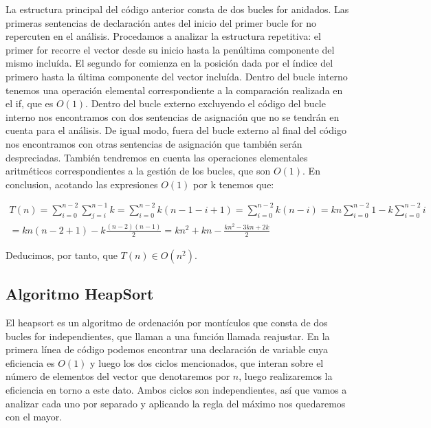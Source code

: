 \documentclass{homework}
\begin{document}
    La estructura principal del código anterior consta de dos bucles for anidados. Las primeras sentencias de declaración antes del inicio del primer 
    bucle for no repercuten en el análisis. Procedamos a analizar la estructura repetitiva: el primer for recorre el vector desde su inicio hasta
    la penúltima componente del mismo incluída. El segundo for comienza en la posición dada por el índice del primero hasta la última componente del vector incluída.
    Dentro del bucle interno tenemos una operación elemental correspondiente a la comparación realizada en el if, que es $O(1)$. Dentro del bucle externo excluyendo 
    el código del bucle interno nos encontramos con dos sentencias de asignación que no se tendrán en cuenta para el análisis. De igual modo, fuera del bucle externo
    al final del código nos encontramos con otras sentencias de asignación que también serán despreciadas. También tendremos en cuenta las operaciones elementales
    aritméticos correspondientes a la gestión de los bucles, que son $O(1)$. En conclusion, acotando las expresiones $O(1)$ por k tenemos que: 

    \begin{equation*}
        \begin{split}
            T(n) = \sum_{i=0}^{n-2} \sum_{j=i}^{n-1} k = \sum_{i=0}^{n-2} k(n-1-i+1) = \sum_{i=0}^{n-2} k(n-i) = kn \sum_{i=0}^{n-2} 1  - k \sum_{i=0}^{n-2} i \\
            = kn(n-2+1) - k \frac{(n-2)(n-1)}{2} = kn^2 + kn - \frac{kn^2 - 3kn + 2k}{2}
        \end{split}
    \end{equation*}
    
    Deducimos, por tanto, que $T(n) \in O(n^2)$. 
    
    \subsection{Algoritmo HeapSort}
    
     

    El heapsort es un algoritmo de ordenación por montículos que consta de dos bucles for independientes, que llaman a una función llamada reajustar.
    En la primera línea de código podemos encontrar una declaración de variable cuya eficiencia es $O(1)$ y luego los dos ciclos mencionados, que interan 
    sobre el número de elementos del vector que denotaremos por $n$, luego realizaremos la eficiencia en torno a este dato. Ambos ciclos son independientes, 
    así que vamos a analizar cada uno por separado y aplicando la regla del máximo nos quedaremos con el mayor.
    
\end{document}
